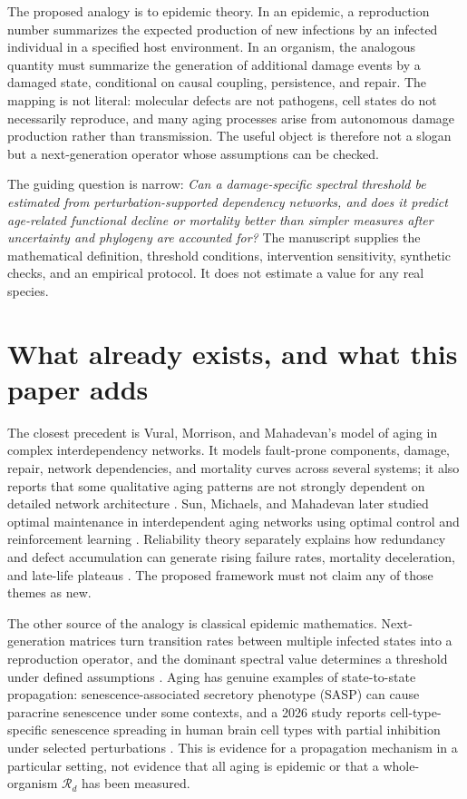 \documentclass[11pt,a4paper]{article}
\newcommand{\Rd}{\mathcal{R}_{d}}
\begin{document}
The proposed analogy is to epidemic theory. In an epidemic, a reproduction number summarizes the expected production of new infections by an infected individual in a specified host environment. In an organism, the analogous quantity must summarize the generation of additional damage events by a damaged state, conditional on causal coupling, persistence, and repair. The mapping is not literal: molecular defects are not pathogens, cell states do not necessarily reproduce, and many aging processes arise from autonomous damage production rather than transmission. The useful object is therefore not a slogan but a next-generation operator whose assumptions can be checked.

The guiding question is narrow: \emph{Can a damage-specific spectral threshold be estimated from perturbation-supported dependency networks, and does it predict age-related functional decline or mortality better than simpler measures after uncertainty and phylogeny are accounted for?} The manuscript supplies the mathematical definition, threshold conditions, intervention sensitivity, synthetic checks, and an empirical protocol. It does not estimate a value for any real species.

\section{What already exists, and what this paper adds}
The closest precedent is Vural, Morrison, and Mahadevan's model of aging in complex interdependency networks. It models fault-prone components, damage, repair, network dependencies, and mortality curves across several systems; it also reports that some qualitative aging patterns are not strongly dependent on detailed network architecture \citep{vural2014}. Sun, Michaels, and Mahadevan later studied optimal maintenance in interdependent aging networks using optimal control and reinforcement learning \citep{vural2020}. Reliability theory separately explains how redundancy and defect accumulation can generate rising failure rates, mortality deceleration, and late-life plateaus \citep{gavrilov2001,gavrilov2004}. The proposed framework must not claim any of those themes as new.

The other source of the analogy is classical epidemic mathematics. Next-generation matrices turn transition rates between multiple infected states into a reproduction operator, and the dominant spectral value determines a threshold under defined assumptions \citep{diekmann2010}. Aging has genuine examples of state-to-state propagation: senescence-associated secretory phenotype (SASP) can cause paracrine senescence under some contexts, and a 2026 study reports cell-type-specific senescence spreading in human brain cell types with partial inhibition under selected perturbations \citep{russo2026}. This is evidence for a propagation mechanism in a particular setting, not evidence that all aging is epidemic or that a whole-organism $\Rd$ has been measured.
\end{document}
